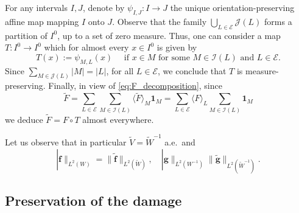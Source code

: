 \documentclass{amsart}
\newcommand{\wt}{\widetilde}
\theoremstyle{definition}
\theoremstyle{remark}
\begin{document}
\medskip

For any intervals $I,J$, denote by $\psi_{I,J}:I\to J$ the unique orientation-preserving affine map mapping $I$ onto $J$. Observe that the family $\bigcup_{L\in\mathscr{E}}\mathscr{J}(L)$ forms a partition of $I^{0}$, up to a set of zero measure. Thus, one can consider a map $T:I^{0}\to I^{0}$ which for almost every $x\in I^{0}$ is given by
\begin{equation*}
    T(x):=\psi_{M,L}(x)\quad\text{ if }x\in M\text{ for some }M\in\mathscr{I}(L)\text{ and }L\in\mathscr{E}.
\end{equation*}
Since $\sum_{M\in\mathscr{J}(L)}|M|=|L|$, for all $L\in\mathscr{E}$, we conclude that $T$ is measure-preserving. Finally, in view of \eqref{eq:F_decomposition}, since
\begin{equation}
    \label{eq:F_tilde_decomposition}
    \wt{F}=\sum_{L\in\mathscr{E}}\sum_{M\in\mathscr{I}(L)}\langle\wt{F}\rangle_{M}\mathbf{1}_{M}=\sum_{L\in\mathscr{E}}\langle F\rangle_{L}\sum_{M\in\mathscr{I}(L)}\mathbf{1}_{M}
\end{equation}
we deduce $\wt{F}=F\circ T$ almost everywhere.

Let us observe that in particular $\wt{V}=\wt{W}^{-1}$ a.e.~and
\begin{equation*}
    |\mathbf{f}\|_{L^2(W)}=\|\wt{\mathbf{f}}\|_{L^2(\wt{W})},\quad |\mathbf{g}\|_{L^2(W^{-1})}\|\wt{\mathbf{g}}\|_{L^2(\wt{W}^{-1})}.
\end{equation*}

\subsection{Preservation of the damage}
\end{document}
